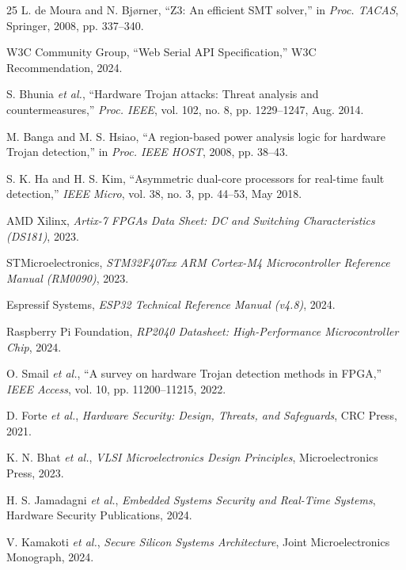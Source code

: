 \documentclass[conference]{IEEEtran}
\begin{document}
\begin{thebibliography}{25}
L. de Moura and N. Bjørner, ``Z3: An efficient SMT solver,'' in \textit{Proc. TACAS}, Springer, 2008, pp. 337--340.

W3C Community Group, ``Web Serial API Specification,'' W3C Recommendation, 2024.

S. Bhunia \textit{et al.}, ``Hardware Trojan attacks: Threat analysis and countermeasures,'' \textit{Proc. IEEE}, vol. 102, no. 8, pp. 1229--1247, Aug. 2014.

M. Banga and M. S. Hsiao, ``A region-based power analysis logic for hardware Trojan detection,'' in \textit{Proc. IEEE HOST}, 2008, pp. 38--43.

S. K. Ha and H. S. Kim, ``Asymmetric dual-core processors for real-time fault detection,'' \textit{IEEE Micro}, vol. 38, no. 3, pp. 44--53, May 2018.

AMD Xilinx, \textit{Artix-7 FPGAs Data Sheet: DC and Switching Characteristics (DS181)}, 2023.

STMicroelectronics, \textit{STM32F407xx ARM Cortex-M4 Microcontroller Reference Manual (RM0090)}, 2023.

Espressif Systems, \textit{ESP32 Technical Reference Manual (v4.8)}, 2024.

Raspberry Pi Foundation, \textit{RP2040 Datasheet: High-Performance Microcontroller Chip}, 2024.

O. Smail \textit{et al.}, ``A survey on hardware Trojan detection methods in FPGA,'' \textit{IEEE Access}, vol. 10, pp. 11200--11215, 2022.

D. Forte \textit{et al.}, \textit{Hardware Security: Design, Threats, and Safeguards}, CRC Press, 2021.

K. N. Bhat \textit{et al.}, \textit{VLSI Microelectronics Design Principles}, Microelectronics Press, 2023.

H. S. Jamadagni \textit{et al.}, \textit{Embedded Systems Security and Real-Time Systems}, Hardware Security Publications, 2024.

V. Kamakoti \textit{et al.}, \textit{Secure Silicon Systems Architecture}, Joint Microelectronics Monograph, 2024.
\end{thebibliography}
\end{document}
